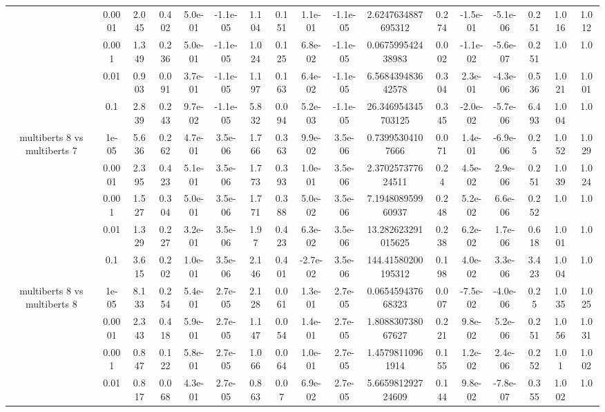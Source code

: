 \begin{tabular}{|c|c|c|c|c|c|c|c|c|c|c|c|c|c|c|c|c|}
 & 0.0001 & 2.045 & 0.402 & 5.0e-01 & -1.1e-05 & 1.104 & 0.151 & 1.1e-01 & -1.1e-05 & 2.6247634887695312 & 0.274 & -1.5e-01 & -5.1e-06 & 0.251 & 1.016 & 1.012 \\
 & 0.001 & 1.349 & 0.236 & 5.0e-01 & -1.1e-05 & 1.024 & 0.125 & 6.8e-02 & -1.1e-05 & 0.067599542438983 & 0.002 & -1.1e-02 & -5.6e-07 & 0.251 & 1.0 & 1.0 \\
 & 0.01 & 0.903 & 0.091 & 3.7e-01 & -1.1e-05 & 1.197 & 0.163 & 6.4e-02 & -1.1e-05 & 6.568439483642578 & 0.304 & 2.3e-01 & -4.3e-06 & 0.536 & 1.021 & 1.001 \\
 & 0.1 & 2.839 & 0.243 & 9.7e-02 & -1.1e-05 & 5.832 & 0.094 & 5.2e-03 & -1.1e-05 & 26.346954345703125 & 0.345 & -2.0e-02 & -5.7e-06 & 6.493 & 1.004 & 1.0 \\
\hline
\multirow{5}{*}{multiberts 8 vs multiberts 7} & 1e-05 & 5.636 & 0.262 & 4.7e-01 & 3.5e-06 & 1.766 & 0.363 & 9.9e-02 & 3.5e-06 & 0.73995304107666 & 0.071 & 1.4e-01 & -6.9e-06 & 0.25 & 1.052 & 1.029 \\
 & 0.0001 & 2.395 & 0.423 & 5.1e-01 & 3.5e-06 & 1.773 & 0.393 & 1.0e-01 & 3.5e-06 & 2.370257377624511 & 0.24 & 4.5e-02 & 2.9e-06 & 0.251 & 1.039 & 1.024 \\
 & 0.001 & 1.527 & 0.304 & 5.0e-01 & 3.5e-06 & 1.771 & 0.388 & 5.0e-02 & 3.5e-06 & 7.194808959960937 & 0.248 & 5.2e-02 & 6.6e-06 & 0.252 & 1.0 & 1.0 \\
 & 0.01 & 1.329 & 0.227 & 3.2e-01 & 3.5e-06 & 1.97 & 0.423 & 6.3e-02 & 3.5e-06 & 13.282623291015625 & 0.238 & 6.2e-02 & 1.7e-06 & 0.618 & 1.001 & 1.0 \\
 & 0.1 & 3.615 & 0.202 & 1.0e-01 & 3.5e-06 & 2.146 & 0.401 & -2.7e-02 & 3.5e-06 & 144.41580200195312 & 0.198 & 4.0e-02 & 3.3e-06 & 3.423 & 1.004 & 1.0 \\
\hline
\multirow{5}{*}{multiberts 8 vs multiberts 8} & 1e-05 & 8.133 & 0.254 & 5.4e-01 & 2.7e-05 & 2.128 & 0.061 & 1.3e-01 & 2.7e-05 & 0.065459437668323 & 0.007 & -7.5e-02 & -4.0e-06 & 0.25 & 1.035 & 1.025 \\
 & 0.0001 & 2.343 & 0.418 & 5.9e-01 & 2.7e-05 & 1.147 & 0.054 & 1.4e-01 & 2.7e-05 & 1.808830738067627 & 0.221 & 9.8e-02 & 5.2e-06 & 0.251 & 1.056 & 1.031 \\
 & 0.001 & 0.847 & 0.122 & 5.8e-01 & 2.7e-05 & 1.066 & 0.064 & 1.0e-01 & 2.7e-05 & 1.45798110961914 & 0.155 & 1.2e-02 & 2.4e-06 & 0.252 & 1.01 & 1.002 \\
 & 0.01 & 0.817 & 0.068 & 4.3e-01 & 2.7e-05 & 0.863 & 0.07 & 6.9e-02 & 2.7e-05 & 5.665981292724609 & 0.144 & 9.8e-02 & -7.8e-07 & 0.355 & 1.002 & 1.0 \\

\end{tabular}
